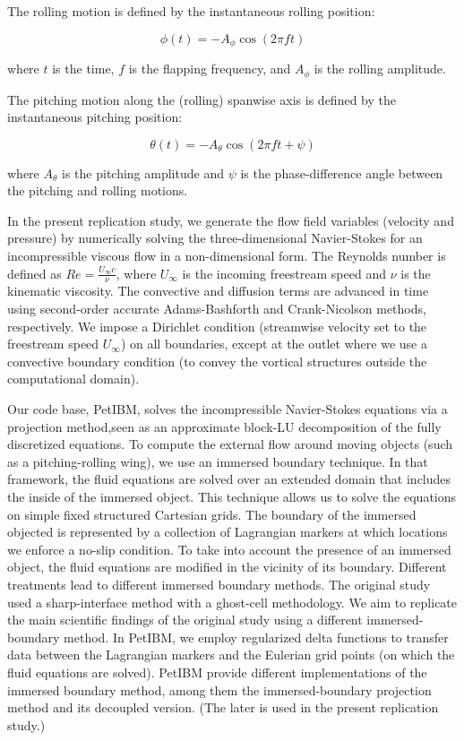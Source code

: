 The rolling motion is defined by the instantaneous rolling position:

\begin{equation}
  \phi (t) = -A_\phi \cos \left( 2 \pi f t \right)
\end{equation}

where $t$ is the time, $f$ is the flapping frequency, and $A_\phi$ is the rolling amplitude.

The pitching motion along the (rolling) spanwise axis is defined by the instantaneous pitching position:

\begin{equation}
  \theta (t) = -A_\theta \cos(2 \pi f t + \psi)
\end{equation}

where $A_\theta$ is the pitching amplitude and $\psi$ is the phase-difference angle between the pitching and rolling motions.

In the present replication study, we generate the flow field variables (velocity and pressure) by numerically solving the three-dimensional Navier-Stokes for an incompressible viscous flow in a non-dimensional form.
The Reynolds number is defined as $Re = \frac{U_\infty c}{\nu}$, where $U_\infty$ is the incoming freestream speed and $\nu$ is the kinematic viscosity.
The convective and diffusion terms are advanced in time using second-order accurate Adams-Bashforth and Crank-Nicolson methods, respectively.
We impose a Dirichlet condition (streamwise velocity set to the freestream speed $U_\infty$) on all boundaries, except at the outlet where we use a convective boundary condition (to convey the vortical structures outside the computational domain).

Our code base, PetIBM, solves the incompressible Navier-Stokes equations via a projection method,seen as an approximate block-LU decomposition of the fully discretized equations.\supercite{perot_1993}
To compute the external flow around moving objects (such as a pitching-rolling wing), we use an immersed boundary technique.
In that framework, the fluid equations are solved over an extended domain that includes the inside of the immersed object.
This technique allows us to solve the equations on simple fixed structured Cartesian grids.
The boundary of the immersed objected is represented by a collection of Lagrangian markers at which locations we enforce a no-slip condition.
To take into account the presence of an immersed object, the fluid equations are modified in the vicinity of its boundary.
Different treatments lead to different immersed boundary methods.
The original study used a sharp-interface method with a ghost-cell methodology.\supercite{mittal_et_al_2008}
We aim to replicate the main scientific findings of the original study using a different immersed-boundary method.
In PetIBM, we employ regularized delta functions to transfer data between the Lagrangian markers and the Eulerian grid points (on which the fluid equations are solved).
PetIBM provide different implementations of the immersed boundary method, among them the immersed-boundary projection method\supercite{taira_colonius_2007} and its decoupled version.\supercite{li_et_al_2016}
(The later is used in the present replication study.)

